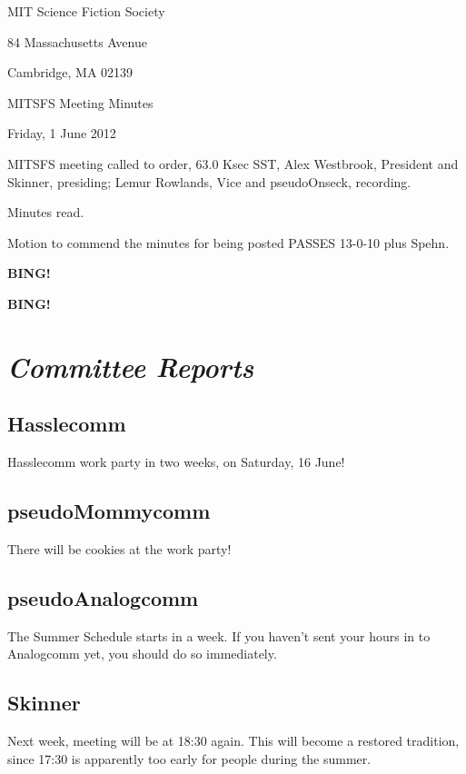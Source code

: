 \documentclass[10pt]{article}
\newcommand{\bing}{{\bf BING!} }
\newcommand{\goto}[1]{\bing \vskip 12pt \section*{{\em{#1}}}}
\newcommand{\ps}{ plus Spehn\xspace}
\newcommand{\skinner}{Alex Westbrook, President and Skinner}
\newcommand{\onseck}{Lemur Rowlands, Vice and pseudoOnseck}
\newcommand{\meetingdate}{Friday, 1 June 2012}
\begin{document}
\begin{center}

MIT Science Fiction Society

84 Massachusetts Avenue

Cambridge, MA 02139

\vspace{12pt}

MITSFS Meeting Minutes

\meetingdate

\end{center}

\vspace{18pt}

\setlength{\parskip}{6pt}

\noindent
MITSFS meeting called to order, 63.0 Ksec SST,
\skinner, presiding; \onseck, recording.

Minutes read.

Motion to commend the minutes for being posted PASSES 13-0-10\ps.

\bing

\goto{Committee Reports}

\subsection*{Hasslecomm}

Hasslecomm work party in two weeks, on Saturday, 16 June!

\subsection*{pseudoMommycomm}

There will be cookies at the work party!

\subsection*{pseudoAnalogcomm}

The Summer Schedule starts in a week.  If you haven't sent your hours
in to Analogcomm yet, you should do so immediately.

\subsection*{Skinner}

Next week, meeting will be at 18:30 again.  This will become a restored
tradition, since 17:30 is apparently too early for people during the
summer.
\end{document}
